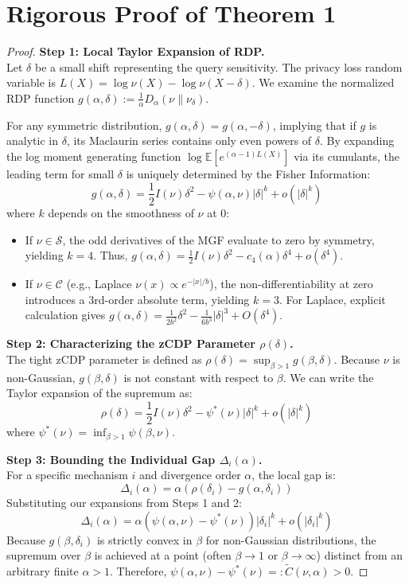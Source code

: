 \documentclass[11pt]{article}
\theoremstyle{definition}
\begin{document}
\section{Rigorous Proof of Theorem 1}

\begin{proof}
\textbf{Step 1: Local Taylor Expansion of RDP.} \\
Let $\delta$ be a small shift representing the query sensitivity. The privacy loss random variable is $L(X) = \log \nu(X) - \log \nu(X-\delta)$. We examine the normalized RDP function $g(\alpha, \delta) := \frac{1}{\alpha} D_\alpha(\nu\|\nu_\delta)$.

For any symmetric distribution, $g(\alpha, \delta) = g(\alpha, -\delta)$, implying that if $g$ is analytic in $\delta$, its Maclaurin series contains only even powers of $\delta$. By expanding the log moment generating function $\log \mathbb{E}[e^{(\alpha-1)L(X)}]$ via its cumulants, the leading term for small $\delta$ is uniquely determined by the Fisher Information:
\[
g(\alpha, \delta) = \frac{1}{2} I(\nu) \delta^2 - \psi(\alpha, \nu) |\delta|^k + o(|\delta|^k)
\]
where $k$ depends on the smoothness of $\nu$ at $0$:
\begin{itemize}
    \item If $\nu \in \mathcal{S}$, the odd derivatives of the MGF evaluate to zero by symmetry, yielding $k=4$. Thus, $g(\alpha, \delta) = \frac{1}{2} I(\nu) \delta^2 - c_4(\alpha) \delta^4 + o(\delta^4)$.
    \item If $\nu \in \mathcal{C}$ (e.g., Laplace $\nu(x) \propto e^{-|x|/b}$), the non-differentiability at zero introduces a 3rd-order absolute term, yielding $k=3$. For Laplace, explicit calculation gives $g(\alpha, \delta) = \frac{1}{2b^2} \delta^2 - \frac{1}{6b^3} |\delta|^3 + O(\delta^4)$.
\end{itemize}

\textbf{Step 2: Characterizing the zCDP Parameter $\rho(\delta)$.} \\
The tight zCDP parameter is defined as $\rho(\delta) = \sup_{\beta > 1} g(\beta, \delta)$. 
Because $\nu$ is non-Gaussian, $g(\beta, \delta)$ is not constant with respect to $\beta$. We can write the Taylor expansion of the supremum as:
\[
\rho(\delta) = \frac{1}{2} I(\nu) \delta^2 - \psi^*(\nu) |\delta|^k + o(|\delta|^k)
\]
where $\psi^*(\nu) = \inf_{\beta > 1} \psi(\beta, \nu)$. 

\textbf{Step 3: Bounding the Individual Gap $\Delta_i(\alpha)$.} \\
For a specific mechanism $i$ and divergence order $\alpha$, the local gap is:
\[
\Delta_i(\alpha) = \alpha \left( \rho(\delta_i) - g(\alpha, \delta_i) \right)
\]
Substituting our expansions from Steps 1 and 2:
\[
\Delta_i(\alpha) = \alpha \left( \psi(\alpha, \nu) - \psi^*(\nu) \right) |\delta_i|^k + o(|\delta_i|^k)
\]
Because $g(\beta, \delta_i)$ is strictly convex in $\beta$ for non-Gaussian distributions, the supremum over $\beta$ is achieved at a point (often $\beta \to 1$ or $\beta \to \infty$) distinct from an arbitrary finite $\alpha > 1$. Therefore, $\psi(\alpha, \nu) - \psi^*(\nu) =: \tilde{C}(\nu, \alpha) > 0$.


\end{proof}
\end{document}
